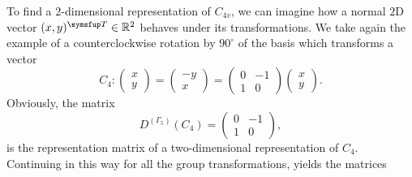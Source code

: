 To find a $2$-dimensional representation of $C_{4v}$, we can imagine how a normal $2$D vector $(x,y)^\trans\in\mathbb{R}^2$ behaves under its transformations.
We take again the example of a counterclockwise rotation by $90^\circ$ of the basis which transforms a vector
\begin{equation}
    \label{eq:Group:Symm:C4transform}
    C_4:\begin{pmatrix}
        x\\
        y
    \end{pmatrix} = 
    \begin{pmatrix}
        -y\\
        x
    \end{pmatrix} = 
    \begin{pmatrix}
        0 & -1\\
        1 & 0
    \end{pmatrix}
    \begin{pmatrix}
        x\\
        y
    \end{pmatrix}.
\end{equation}
Obviously, the matrix 
\begin{equation}
    \label{eq:Group:Symm:C4G5D}
    D^{(\Gamma_5)}(C_4) = 
    \begin{pmatrix}
        0 & -1\\
        1 & 0
    \end{pmatrix},
\end{equation}
is the representation matrix of a two-dimensional representation of $C_4$. Continuing in this way for all the group transformations, yields the matrices
